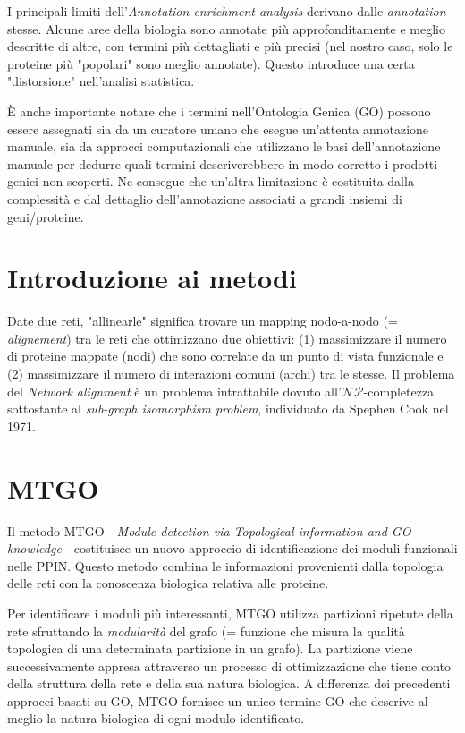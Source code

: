 \documentclass[11pt]{article}
\begin{document}
I principali limiti dell'\textit{Annotation enrichment analysis} derivano dalle \textit{annotation} stesse. Alcune aree della biologia sono annotate più approfonditamente e meglio descritte di altre, con termini più dettagliati e più precisi (nel nostro caso, solo le proteine più "popolari" sono meglio annotate). Questo introduce una certa "distorsione" nell'analisi statistica.

È anche importante notare che i termini nell'Ontologia Genica (GO) possono essere assegnati sia da un curatore umano che esegue un'attenta annotazione manuale, sia da approcci computazionali che utilizzano le basi dell'annotazione manuale per dedurre quali termini descriverebbero in modo corretto i prodotti genici non scoperti. Ne consegue che un'altra limitazione è costituita dalla complessità e dal dettaglio dell'annotazione associati a grandi insiemi di geni/proteine. 
\pagebreak

\section{Introduzione ai metodi}
Date due reti, "allinearle" significa trovare un mapping nodo-a-nodo (= \textit{alignement}) tra le reti che ottimizzano due obiettivi: (1) massimizzare il numero di proteine mappate (nodi) che sono correlate da un punto di vista funzionale e (2) massimizzare il numero di interazioni comuni (archi) tra le stesse.
Il problema del \textit{Network alignment} è un problema intrattabile dovuto all'$\mathcal{NP}$-completezza sottostante al \textit{sub-graph isomorphism problem}, individuato da Spephen Cook nel 1971.

\section{MTGO}
Il metodo MTGO - \textit{Module detection via Topological information and GO knowledge} - costituisce un nuovo approccio di identificazione dei moduli funzionali nelle PPIN. Questo metodo combina le informazioni provenienti dalla topologia delle reti con la conoscenza biologica relativa alle proteine.
 
Per identificare i moduli più interessanti, MTGO utilizza partizioni ripetute della rete sfruttando la \textit{modularità} del grafo (= funzione che misura la qualità topologica di una determinata partizione in un grafo). La partizione viene successivamente appresa attraverso un processo di ottimizzazione che tiene conto della struttura della rete e della sua natura biologica. A differenza dei precedenti approcci basati su GO, MTGO fornisce un unico termine GO che descrive al meglio la natura biologica di ogni modulo identificato.
\end{document}
